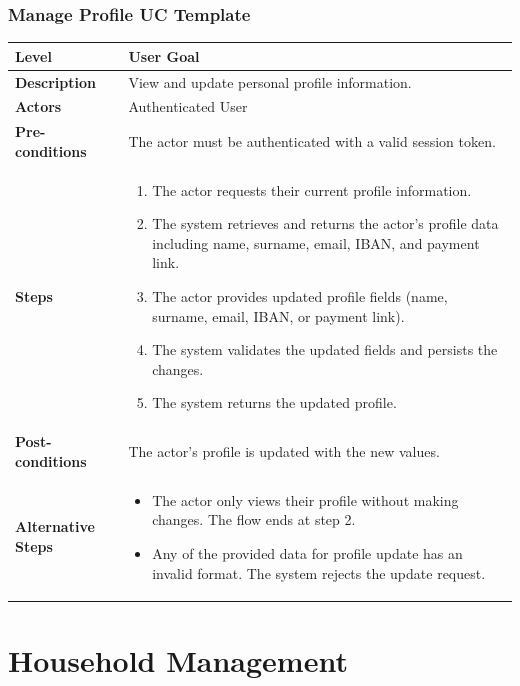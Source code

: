 \subsubsection{Manage Profile UC Template}
\begin{longtable}{|p{3.5cm}|p{10.3cm}|}
\hline
\rowcolor{UCRow} \textbf{Level} & User Goal \\ \hline
\textbf{Description} & View and update personal profile information. \\ \hline
\rowcolor{UCRow} \textbf{Actors} & Authenticated User \\ \hline
\textbf{Pre-conditions} & The actor must be authenticated with a valid session token. \\ \hline
\rowcolor{UCRow} \textbf{Steps} &
\begin{enumerate}[nosep, leftmargin=*]
    \item The actor requests their current profile information.
    \item The system retrieves and returns the actor's profile data including name, surname, email, IBAN, and payment link.
    \item The actor provides updated profile fields (name, surname, email, IBAN, or payment link).
    \item The system validates the updated fields and persists the changes.
    \item The system returns the updated profile.
\end{enumerate} \\ \hline
\textbf{Post-conditions} & The actor's profile is updated with the new values. \\ \hline
\rowcolor{UCRow} \textbf{Alternative Steps} &
\begin{itemize}[nosep, leftmargin=2.5em]
    \item[\textbf{A1.}] The actor only views their profile without making changes. The flow ends at step 2.
    \item[\textbf{A2.}] Any of the provided data for profile update has an invalid format. The system rejects the update request.
\end{itemize} \\ \hline
\end{longtable}

\section{Household Management}

